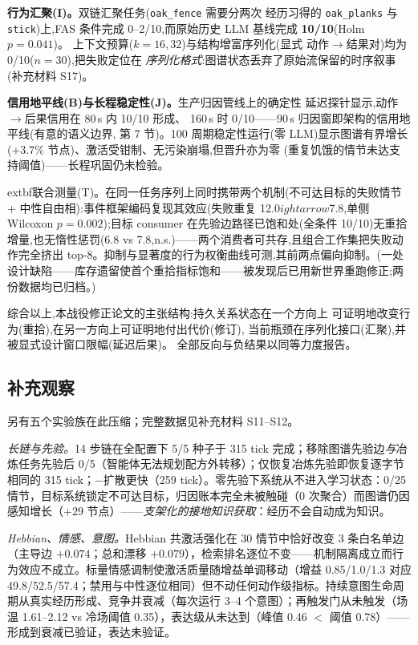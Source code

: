 \documentclass[10pt,a4paper]{ctexart}
\begin{document}
\textbf{行为汇聚(I)。}双链汇聚任务(\texttt{oak\_fence} 需要分两次
经历习得的 \texttt{oak\_planks} 与 \texttt{stick})上,FAS 条件完成
0--2/10,而原始历史 LLM 基线完成 \textbf{10/10}(Holm $p{=}0.041$)。
上下文预算($k{=}16,32$)与结构增富序列化(显式
动作$\rightarrow$结果对)均为 0/10($n{=}30$),把失败定位在
\emph{序列化格式}:图谱状态丢弃了原始流保留的时序叙事
(补充材料 S17)。

\textbf{信用地平线(B)与长程稳定性(J)。}生产归因管线上的确定性
延迟探针显示,动作$\rightarrow$后果信用在 80\,s 内 10/10 形成、
160\,s 时 0/10——90\,s 归因窗即架构的信用地平线(有意的语义边界,
第 7 节)。100 周期稳定性运行(零 LLM)显示图谱有界增长
($+3.7\%$ 节点)、激活受钳制、无污染崩塌,但晋升亦为零
(重复饥饿的情节未达支持阈值)——长程巩固仍未检验。

	extbf{联合测量(T)。}在同一任务序列上同时携带两个机制(不可达目标的失败情节 + 中性自由相):事件框架编码复现其效应(失败重复 12.0$
ightarrow$7.8,单侧 Wilcoxon $p{=}0.002$);目标 consumer 在先验边路径已饱和处(全条件 10/10)无重拾增量,也无惰性惩罚(6.8 vs 7.8,n.s.)——两个消费者可共存,且组合工作集把失败动作完全挤出 top-8。抑制与显著度的行为权衡曲线可测,其前两点偏向抑制。(一处设计缺陷——库存遗留使首个重拾指标饱和——被发现后已用新世界重跑修正;两份数据均已归档。)

综合以上,本战役修正论文的主张结构:持久关系状态在一个方向上
可证明地改变行为(重拾),在另一方向上可证明地付出代价(修订),
当前瓶颈在序列化接口(汇聚),并被显式设计窗口限幅(延迟后果)。
全部反向与负结果以同等力度报告。

\subsection{补充观察}
\label{sec:res-system}
另有五个实验族在此压缩；完整数据见补充材料 S11--S12。

\emph{长链与先验。}14 步链在全配置下 5/5 种子于 315 tick 完成；移除图谱先验边\emph{与}冶炼任务先验后 0/5（智能体无法规划配方外转移）；仅恢复冶炼先验即恢复逐字节相同的 315 tick；$-$扩散更快（259 tick）。零先验下系统从不进入学习状态：0/25 情节，目标系统锁定不可达目标，归因账本完全未被触碰（0 次聚合）而图谱仍因感知增长（$+29$ 节点）——\emph{支架化的接地知识获取}：经历不会自动成为知识。

\emph{Hebbian、情感、意图。}Hebbian 共激活强化在 30 情节中恰好改变 3 条白名单边（主导边 $+0.074$；总和漂移 $+0.079$），检索排名逐位不变——机制隔离成立而行为效应不成立。标量情感调制使激活质量随增益单调移动（增益 0.85/1.0/1.3 对应 49.8/52.5/57.4；禁用与中性逐位相同）但不动任何动作级指标。持续意图生命周期从真实经历形成、竞争并衰减（每次运行 3--4 个意图）；再触发门从未触发（场温 1.61--2.12 vs 冷场阈值 0.35），表达级从未达到（峰值 0.46 $<$ 阈值 0.78）——形成到衰减已验证，表达未验证。
\end{document}
